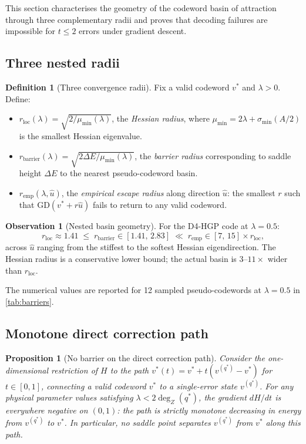 \documentclass[12pt,a4paper]{article}
\theoremstyle{plain}
\newtheorem{proposition}[theorem]{Proposition}
\theoremstyle{definition}
\newtheorem{definition}[theorem]{Definition}
\newtheorem{observation}[theorem]{Observation}
\theoremstyle{remark}
\newcommand{\dZ}{\operatorname{deg}_Z}
\begin{document}
This section characterises the geometry of the codeword basin of attraction
through three complementary radii and proves that decoding failures are
impossible for $t \leq 2$ errors under gradient descent.

\subsection{Three nested radii}

\begin{definition}[Three convergence radii]\label{def:radii}
Fix a valid codeword $v^*$ and $\lambda > 0$. Define:
\begin{itemize}[noitemsep]
\item $r_{\mathrm{loc}}(\lambda) = \sqrt{2/\mu_{\min}(\lambda)}$, the
  \emph{Hessian radius}, where $\mu_{\min} = 2\lambda + \sigma_{\min}(A/2)$
  is the smallest Hessian eigenvalue.
\item $r_{\mathrm{barrier}}(\lambda) = \sqrt{2\Delta E / \mu_{\min}(\lambda)}$,
  the \emph{barrier radius} corresponding to saddle height $\Delta E$ to
  the nearest pseudo-codeword basin.
\item $r_{\mathrm{emp}}(\lambda, \hat{u})$, the \emph{empirical escape radius}
  along direction $\hat{u}$: the smallest $r$ such that
  $\mathrm{GD}(v^* + r\hat{u})$ fails to return to any valid codeword.
\end{itemize}
\end{definition}

\begin{observation}[Nested basin geometry]\label{obs:nested}
For the D4-HGP code at $\lambda = 0.5$:
\[
  r_{\mathrm{loc}} \approx 1.41
  \;\leq\;
  r_{\mathrm{barrier}} \in [1.41,\, 2.83]
  \;\ll\;
  r_{\mathrm{emp}} \in [7,\, 15] \times r_{\mathrm{loc}},
\]
across $\hat{u}$ ranging from the stiffest to the softest Hessian
eigendirection.
The Hessian radius is a conservative lower bound; the actual basin is
$3$--$11\times$ wider than $r_{\mathrm{loc}}$.
\end{observation}

The numerical values are reported for 12 sampled pseudo-codewords at
$\lambda=0.5$ in \cref{tab:barriers}.

\subsection{Monotone direct correction path}

\begin{proposition}[No barrier on the direct correction path]\label{prop:monotone}
Consider the one-dimensional restriction of $H$ to the path
$v^*(t) = v^* + t(v^{(q^*)} - v^*)$ for $t\in[0,1]$,
connecting a valid codeword $v^*$ to a single-error state $v^{(q^*)}$.
For any physical parameter values satisfying $\lambda < 2\dZ(q^*)$,
the gradient $dH/dt$ is everywhere negative on $(0,1)$: the path is
\emph{strictly monotone decreasing} in energy from $v^{(q^*)}$ to $v^*$.
In particular, no saddle point separates $v^{(q^*)}$ from $v^*$ along
this path.
\end{proposition}
\end{document}
